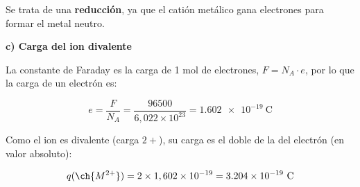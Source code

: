 \begin{exercise}
\begin{solu}
        Se trata de una \textbf{reducción}, ya que el catión metálico gana electrones para formar el metal neutro.

        \textbf{c) Carga del ion divalente}

        La constante de Faraday es la carga de 1 mol de electrones, \(F = N_A \cdot e\), por lo que la carga de un electrón es:

        \begin{equation*}
            e = \dfrac{F}{N_A} = \dfrac{96500}{6,022\times10^{23}} = \num{1.602e-19} \ \si{\coulomb}
        \end{equation*}

        Como el ion es divalente (carga \(2+\)), su carga es el doble de la del electrón (en valor absoluto):

        \begin{equation*}
            q(\ch{M^{2+}}) = 2 \times 1,602\times10^{-19} = \num{3.204e-19} \ \si{\coulomb}
        \end{equation*}

    \end{solu}
\end{exercise}

